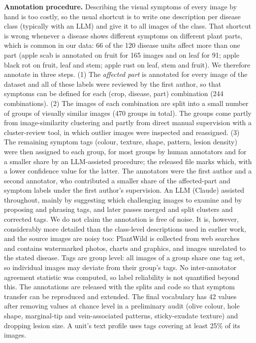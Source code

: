 \documentclass[11pt]{article}
\begin{document}
\textbf{Annotation procedure.} Describing the visual symptoms of every image by hand is too costly, so the usual shortcut is to write one description per disease class (typically with an LLM) and give it to all images of the class. That shortcut is wrong whenever a disease shows different symptoms on different plant parts, which is common in our data: 66 of the 120 disease units affect more than one part (apple scab is annotated on fruit for 165 images and on leaf for 91; apple black rot on fruit, leaf and stem; apple rust on leaf, stem and fruit). We therefore annotate in three steps. (1) The \emph{affected part} is annotated for every image of the dataset and all of these labels were reviewed by the first author, so that symptoms can be defined for each (crop, disease, part) combination (244 combinations). (2) The images of each combination are split into a small number of groups of visually similar images (470 groups in total). The groups come partly from image-similarity clustering and partly from direct manual supervision with a cluster-review tool, in which outlier images were inspected and reassigned. (3) The remaining symptom tags (colour, texture, shape, pattern, lesion density) were then assigned to each group, for most groups by human annotators and for a smaller share by an LLM-assisted procedure; the released file marks which, with a lower confidence value for the latter. The annotators were the first author and a second annotator, who contributed a smaller share of the affected-part and symptom labels under the first author's supervision. An LLM (Claude) assisted throughout, mainly by suggesting which challenging images to examine and by proposing and phrasing tags, and later passes merged and split clusters and corrected tags. We do not claim the annotation is free of noise. It is, however, considerably more detailed than the class-level descriptions used in earlier work, and the source images are noisy too: PlantWild is collected from web searches and contains watermarked photos, charts and graphics, and images unrelated to the stated disease. Tags are group level: all images of a group share one tag set, so individual images may deviate from their group's tags. No inter-annotator agreement statistic was computed, so label reliability is not quantified beyond this. The annotations are released with the splits and code so that symptom transfer can be reproduced and extended.
The final vocabulary has 42 values after removing values at chance level in a preliminary audit (olive colour, hole shape, marginal-tip and vein-associated patterns, sticky-exudate texture) and dropping lesion size. A unit's text profile uses tags covering at least 25\% of its images.
\end{document}
